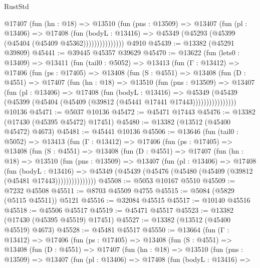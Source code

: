 \begin{lexlean}{RustStd}
\begin{coremodule}
                @17407
                  (fun (hn : @18) =>
                  @13510
                    (fun (pns : @13509) =>
                    @13407
                      (fun (pl : @13406) =>
                      @17408
                        (fun (bodyL : @13416) =>
                        @45349 (@45293 (@45399 (@45404 (@45409 @45362)))))))))))))))
    @4910
@45439 := @13382 (@45291 @39809)
@45441 := @39445 @45357 @39629
@45470 := @13622
    (fun (lets0 : @13409) =>
    @13411
      (fun (tail0 : @5052) =>
      @13413
        (fun (Γ : @13412) =>
        @17406
          (fun (ps : @17405) =>
          @13408
            (fun (S : @4551) =>
            @13408
              (fun (D : @4551) =>
              @17407
                (fun (hn : @18) =>
                @13510
                  (fun (pns : @13509) =>
                  @13407
                    (fun (pl : @13406) =>
                    @17408
                      (fun (bodyL : @13416) =>
                      @45349
                        (@45439
                          (@45399 (@45404 (@45409 (@39812 (@45441 @17441 @17443))))))))))))))))
    @10136
@45471 := @5037 @10136
@45472 := @45471 @17443
@45476 := @13382 (@17430 (@45395 @45472) @17451)
@45480 := @13382 (@13512 (@45400 @45472) @4673)
@45481 := @45441 @10136
@45506 := @13646
    (fun (tail0 : @5052) =>
    @13413
      (fun (Γ : @13412) =>
      @17406
        (fun (ps : @17405) =>
        @13408
          (fun (S : @4551) =>
          @13408
            (fun (D : @4551) =>
            @17407
              (fun (hn : @18) =>
              @13510
                (fun (pns : @13509) =>
                @13407
                  (fun (pl : @13406) =>
                  @17408
                    (fun (bodyL : @13416) =>
                    @45349 (@45439 (@45476 (@45480 (@45409 (@39812 (@45481 @17443)))))))))))))))
@45508 := @5053 @10167 @5510
@45509 := @7232 @45508
@45511 := @8703 @45509 @4755
@45515 := @5084 (@5829 (@5115 @45511)) @5121
@45516 := @32084 @45515
@45517 := @10140 @45516
@45518 := @45506 @45517
@45519 := @45471 @45517
@45523 := @13382 (@17430 (@45395 @45519) @17451)
@45527 := @13382 (@13512 (@45400 @45519) @4673)
@45528 := @45481 @45517
@45550 := @13664
    (fun (Γ : @13412) =>
    @17406
      (fun (ps : @17405) =>
      @13408
        (fun (S : @4551) =>
        @13408
          (fun (D : @4551) =>
          @17407
            (fun (hn : @18) =>
            @13510
              (fun (pns : @13509) =>
              @13407
                (fun (pl : @13406) =>
                @17408
                  (fun (bodyL : @13416) =>

\end{coremodule}
\end{lexlean}
